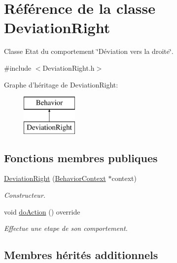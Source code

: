 \hypertarget{class_deviation_right}{\section{Référence de la classe Deviation\-Right}
\label{class_deviation_right}
}


Classe Etat du comportement \char`\"{}\-Déviation vers la droite\char`\"{}.  




{\ttfamily \#include $<$Deviation\-Right.\-h$>$}

Graphe d'héritage de Deviation\-Right\-:\begin{figure}[H]
\begin{center}
\leavevmode
\includegraphics[height=2.000000cm]{class_deviation_right}
\end{center}
\end{figure}
\subsection*{Fonctions membres publiques}
{\bf }\par
\begin{DoxyCompactItemize}
\item 
\hyperlink{class_deviation_right_a022583d0e7a46e3c130994c9aecc12e5}{Deviation\-Right} (\hyperlink{class_behavior_context}{Behavior\-Context} $\ast$context)
\begin{DoxyCompactList}\small\item\em Constructeur. \end{DoxyCompactList}\item 
void \hyperlink{class_deviation_right_a98734577f0efa5672412f410c3dbc551}{do\-Action} () override
\begin{DoxyCompactList}\small\item\em Effectue une etape de son comportement. \end{DoxyCompactList}\end{DoxyCompactItemize}

\subsection*{Membres hérités additionnels}


